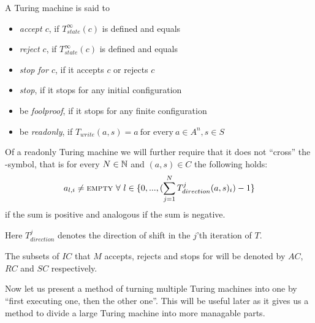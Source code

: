 \begin{Definition}
	A Turing machine is said to
	\begin{itemize}
		\item{\emph{accept $c$}, if $T_{state}^\infty(c)$ is defined and equals \ACC}
		\item{\emph{reject $c$}, if $T_{state}^\infty(c)$ is defined and equals \REJ}
		\item{\emph{stop for $c$}, if it accepts $c$ or rejects $c$}
		\item{\emph{stop}, if it stops for any initial configuration}
		\item{be \emph{foolproof}, if it stops for any finite configuration}
		\item{be \emph{readonly}, if $T_{write}(a,s) = a ~\text{for every}~ a \in A^n, s \in S$}
	\end{itemize}
	Of a readonly Turing machine we will further require that it does not ``cross'' the \EMP-symbol, that is for every $N \in \mathbb{N}$ and $(a,s) \in C$ the following holds:
	\begin{align*}
		a_{l,i} \neq \text{\scshape{empty}}~\forall~l \in \{0,...,(\sum_{j=1}^N T_{direction}^j(a,s)_i) -1\}
	\end{align*}
	if the sum is positive and analogous if the sum is negative.\footnotemark

	Here $T_{direction}^j$ denotes the direction of shift in the $j$'th iteration of $T$.

\end{Definition}

The subsets of $IC$ that $M$ accepts, rejects and stops for will be denoted by $AC$, $RC$ and $SC$ respectively.

Now let us present a method of turning multiple Turing machines into one by ``first executing one, then the other one''. This will be useful later as it gives us a method to divide a large Turing machine into more managable parts.

